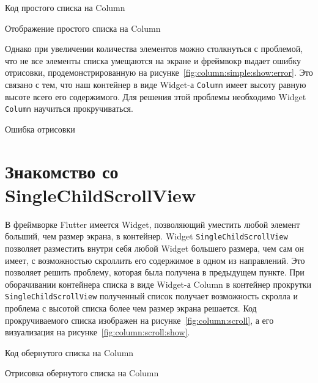 \begin{image}
	\caption{Код простого списка на Column}
	\label{fig:column:simple}
\end{image}

\begin{image}
	\caption{Отображение простого списка на Column}
	\label{fig:column:simple:show}
\end{image}

Однако при увеличении количества элементов можно столкнуться с проблемой,
что не все элементы списка умещаются на экране
и фреймвокр выдает ошибку отрисовки, продемонстрированную
на рисунке~\ref{fig:column:simple:show:error}.
Это связано с тем, что наш контейнер в виде Widget-а \texttt{Column}
имеет высоту равную высоте всего его содержимого.
Для решения этой проблемы необходимо
Widget \texttt{Column} научиться прокручиваться.

\begin{image}
	\caption{Ошибка отрисовки}
	\label{fig:column:simple:show:error}
\end{image}

\section{Знакомство со SingleChildScrollView}

В фреймворке Flutter имеется Widget,
позволяющий уместить любой элемент больший, чем размер экрана, в контейнер.
Widget \texttt{SingleChildScrollView} позволяет разместить внутри себя
любой Widget большего размера, чем сам он имеет,
с возможностью скроллить его содержимое в одном из направлений.
Это позволяет решить проблему, которая была получена в предыдущем пункте.
При оборачивании контейнера списка в виде Widget-а Column
в контейнер прокрутки \texttt{SingleChildScrollView}
полученный список получает возможность скролла и проблема
с высотой списка более чем размер экрана решается.
Код прокручиваемого списка изображен на рисунке~\ref{fig:column:scroll},
а его визуализация на рисунке~\ref{fig:column:scroll:show}.

\begin{image}
	\caption{Код обернутого списка на Column}
	\label{fig:column:scroll}
\end{image}

\begin{image}
	\caption{Отрисовка обернутого списка на Column}
	\label{fig:column:scroll:show}
\end{image}

